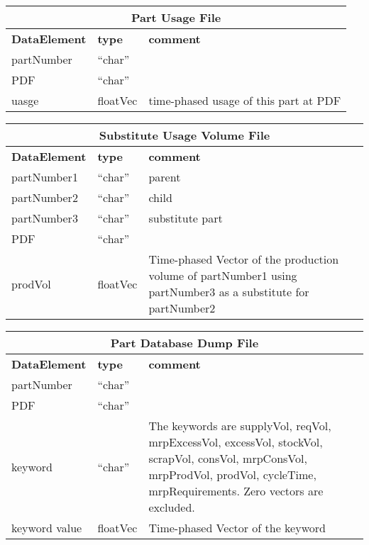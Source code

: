 \begin{tabular}{llp{4in}}
\multicolumn{3}{c}{{\bf Part Usage File}}\\ \hline\hline
{\bf DataElement} &  {\bf type}  &   {\bf comment} \\ \hline
partNumber &  ``char''     \\ 
PDF   & ``char''  \\
uasge          & floatVec &  time-phased usage of this part at PDF\\
\end{tabular}

\vspace{.5in}

\begin{tabular}{llp{4in}}
\multicolumn{3}{c}{{\bf Substitute Usage Volume File}}\\ \hline\hline
{\bf DataElement} &  {\bf type}  &   {\bf comment} \\ \hline
partNumber1 & ``char''  & parent\\
partNumber2 & ``char''  & child \\
partNumber3 & ``char''  & substitute part\\
PDF        & ``char''  \\
prodVol    & floatVec &  Time-phased Vector of the production volume of
                      partNumber1 using partNumber3 as a substitute for
                      partNumber2 \\
\end{tabular}

\vspace{.5in}

\begin{tabular}{llp{4in}}
\multicolumn{3}{c}{{\bf Part Database Dump File}}\\ \hline\hline
{\bf DataElement} &  {\bf type}  &   {\bf comment} \\ \hline
partNumber & ``char''  \\
PDF & ``char''  \\
keyword & ``char''  & The keywords are supplyVol, reqVol, mrpExcessVol, excessVol,
   stockVol, scrapVol, consVol, mrpConsVol, mrpProdVol, prodVol, cycleTime,
   mrpRequirements.
   Zero vectors are excluded.\\
keyword value  & floatVec &  Time-phased Vector of the keyword \\
\end{tabular}

\vspace{.5in}

